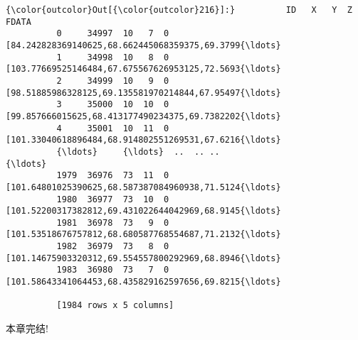 \documentclass[11pt]{article}
\begin{document}
\begin{Verbatim}[commandchars=\\\{\}]
{\color{outcolor}Out[{\color{outcolor}216}]:}          ID   X   Y  Z                                              FDATA
          0     34997  10   7  0  [84.242828369140625,68.662445068359375,69.3799{\ldots}
          1     34998  10   8  0  [103.77669525146484,67.675567626953125,72.5693{\ldots}
          2     34999  10   9  0  [98.51885986328125,69.135581970214844,67.95497{\ldots}
          3     35000  10  10  0  [99.857666015625,68.413177490234375,69.7382202{\ldots}
          4     35001  10  11  0  [101.33040618896484,68.914802551269531,67.6216{\ldots}
          {\ldots}     {\ldots}  ..  .. ..                                                {\ldots}
          1979  36976  73  11  0  [101.64801025390625,68.587387084960938,71.5124{\ldots}
          1980  36977  73  10  0  [101.52200317382812,69.431022644042969,68.9145{\ldots}
          1981  36978  73   9  0  [101.53518676757812,68.680587768554687,71.2132{\ldots}
          1982  36979  73   8  0  [101.14675903320312,69.554557800292969,68.8946{\ldots}
          1983  36980  73   7  0  [101.58643341064453,68.435829162597656,69.8215{\ldots}
          
          [1984 rows x 5 columns]
\end{Verbatim}
            
    本章完结!


    
    
    
    
\end{document}

